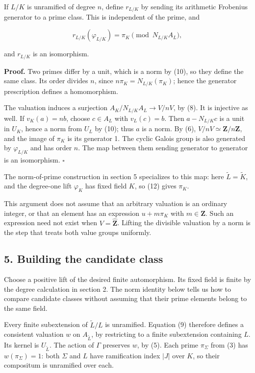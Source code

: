 \documentclass[11pt,a4paper]{article}
\begin{document}
If \(L/K\) is unramified of degree \(n\), define \(r_{L/K}\) by sending
its arithmetic Frobenius generator to a prime class. This is independent
of the prime, and

\[
r_{L/K}(\varphi_{L/K})=\pi_K\pmod{N_{L/K}A_L},
\]

and \(r_{L/K}\) is an isomorphism.

\textbf{Proof.} Two primes differ by a unit, which is a norm by (10), so
they define the same class. Its order divides \(n\), since
\(n\pi_K=N_{L/K}(\pi_K)\); hence the generator prescription defines a
homomorphism.

The valuation induces a surjection \(A_K/N_{L/K}A_L\to V/nV\), by (8).
It is injective as well. If \(v_K(a)=nb\), choose \(c\in A_L\) with
\(v_L(c)=b\). Then \(a-N_{L/K}c\) is a unit in \(U_K\), hence a norm
from \(U_L\) by (10); thus \(a\) is a norm. By (6),
\(V/nV\simeq\mathbf Z/n\mathbf Z\), and the image of \(\pi_K\) is its
generator 1. The cyclic Galois group is also generated by
\(\varphi_{L/K}\) and has order \(n\). The map between them sending
generator to generator is an isomorphism. \(\square\)

The norm-of-prime construction in section 5 specializes to this map:
here \(\widetilde L=\widetilde K\), and the degree-one lift
\(\varphi_K\) has fixed field \(K\), so (12) gives \(\pi_K\).

This argument does not assume that an arbitrary valuation is an ordinary
integer, or that an element has an expression \(u+m\pi_K\) with
\(m\in\mathbf Z\). Such an expression need not exist when
\(V=\widehat{\mathbf Z}\). Lifting the divisible valuation by a norm is
the step that treats both value groups uniformly.

\subsection{5. Building the candidate
class}\label{building-the-candidate-class}

Choose a positive lift of the desired finite automorphism. Its fixed
field is finite by the degree calculation in section 2. The norm
identity below tells us how to compare candidate classes without
assuming that their prime elements belong to the same field.

Every finite subextension of \(\widetilde L/L\) is unramified. Equation
(9) therefore defines a consistent valuation \(w\) on
\(A_{\widetilde L}\), by restricting to a finite subextension containing
\(L\). Its kernel is \(U_{\widetilde L}\). The action of \(\Gamma\)
preserves \(w\), by (5). Each prime \(\pi_\Sigma\) from (3) has
\(w(\pi_\Sigma)=1\): both \(\Sigma\) and \(L\) have ramification index
\(|J|\) over \(K\), so their compositum is unramified over each.
\end{document}

